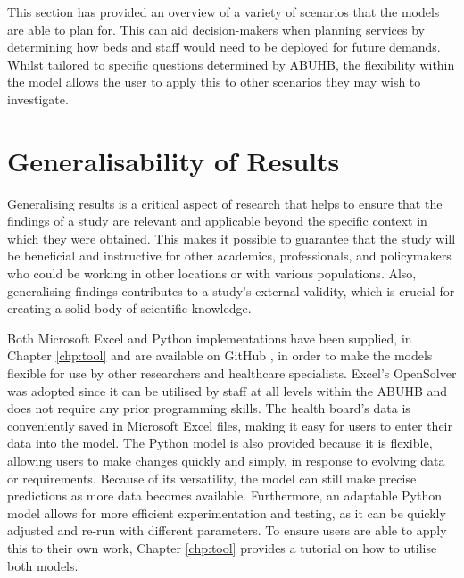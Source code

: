 \documentclass[../thesis.tex]{subfiles}
\begin{document}
This section has provided an overview of a variety of scenarios that the models are able to plan for. This can aid decision-makers when planning services by determining how beds and staff would need to be deployed for future demands. Whilst tailored to specific questions determined by ABUHB, the flexibility within the model allows the user to apply this to other scenarios they may wish to investigate.



\section{Generalisability of Results}\label{sec:generalization}

Generalising results is a critical aspect of research that helps to ensure that the findings of a study are relevant and applicable beyond the specific context in which they were obtained. This makes it possible to guarantee that the study will be beneficial and instructive for other academics, professionals, and policymakers who could be working in other locations or with various populations. Also, generalising findings contributes to a study's external validity, which is crucial for creating a solid body of scientific knowledge.

Both Microsoft Excel and Python implementations have been supplied, in Chapter \ref{chp:tool} and are available on GitHub \cite{Williams2023}, in order to make the models flexible for use by other researchers and healthcare specialists. Excel's OpenSolver was adopted since it can be utilised by staff at all levels within the ABUHB and does not require any prior programming skills. The health board's data is conveniently saved in Microsoft Excel files, making it easy for users to enter their data into the model. The Python model is also provided because it is flexible, allowing users to make changes quickly and simply, in response to evolving data or requirements. Because of its versatility, the model can still make precise predictions as more data becomes available. Furthermore, an adaptable Python model allows for more efficient experimentation and testing, as it can be quickly adjusted and re-run with different parameters. To ensure users are able to apply this to their own work, Chapter \ref{chp:tool} provides a tutorial on how to utilise both models.
\end{document}
